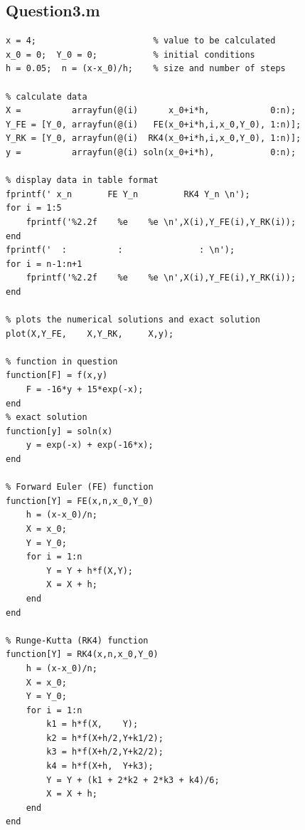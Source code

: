 \documentclass[a4paper]{article}
\begin{document}
\pagebreak
\subsection*{Question\textunderscore3.m}
\begin{lstlisting}[style = Matlab-editor]
x = 4;                       % value to be calculated
x_0 = 0;  Y_0 = 0;           % initial conditions
h = 0.05;  n = (x-x_0)/h;    % size and number of steps

% calculate data
X =          arrayfun(@(i)      x_0+i*h,            0:n);
Y_FE = [Y_0, arrayfun(@(i)   FE(x_0+i*h,i,x_0,Y_0), 1:n)];
Y_RK = [Y_0, arrayfun(@(i)  RK4(x_0+i*h,i,x_0,Y_0), 1:n)];
y =          arrayfun(@(i) soln(x_0+i*h),           0:n);

% display data in table format
fprintf(' x_n       FE Y_n         RK4 Y_n \n');
for i = 1:5
    fprintf('%2.2f    %e    %e \n',X(i),Y_FE(i),Y_RK(i));
end
fprintf('  :          :               : \n');
for i = n-1:n+1
    fprintf('%2.2f    %e    %e \n',X(i),Y_FE(i),Y_RK(i));
end

% plots the numerical solutions and exact solution
plot(X,Y_FE,    X,Y_RK,     X,y);

% function in question
function[F] = f(x,y)
    F = -16*y + 15*exp(-x);
end
% exact solution
function[y] = soln(x)
    y = exp(-x) + exp(-16*x);
end

% Forward Euler (FE) function
function[Y] = FE(x,n,x_0,Y_0)
    h = (x-x_0)/n;
    X = x_0;
    Y = Y_0;
    for i = 1:n
        Y = Y + h*f(X,Y);
        X = X + h;
    end   
end

% Runge-Kutta (RK4) function
function[Y] = RK4(x,n,x_0,Y_0)
    h = (x-x_0)/n;
    X = x_0;
    Y = Y_0;
    for i = 1:n
        k1 = h*f(X,    Y);
        k2 = h*f(X+h/2,Y+k1/2);
        k3 = h*f(X+h/2,Y+k2/2);
        k4 = h*f(X+h,  Y+k3);
        Y = Y + (k1 + 2*k2 + 2*k3 + k4)/6;
        X = X + h;
    end
end
\end{lstlisting}

\pagebreak
\end{document}
